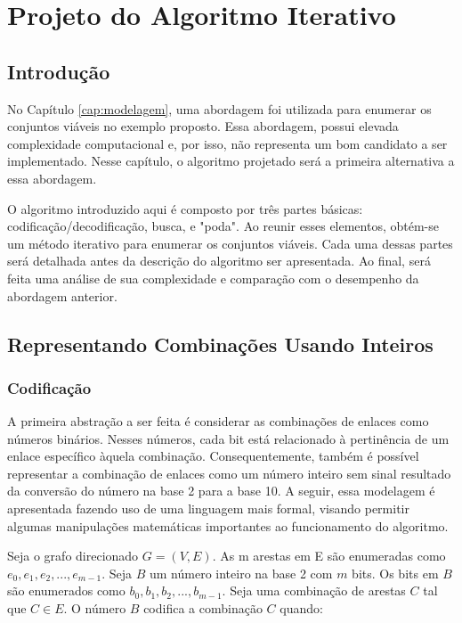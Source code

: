 \chapter{Projeto do Algoritmo Iterativo}
\label{cap:iterativo}

\section{Introdução}

No Capítulo \ref{cap:modelagem}, uma abordagem foi utilizada para enumerar os conjuntos viáveis no exemplo proposto. Essa abordagem, possui elevada complexidade computacional e, por isso, não representa um bom candidato a ser implementado. Nesse capítulo, o algoritmo projetado será a primeira alternativa a essa abordagem.

O algoritmo introduzido aqui é composto por três partes básicas: codificação/decodificação, busca, e "poda". Ao reunir esses elementos, obtém-se um método iterativo para enumerar os conjuntos viáveis. Cada uma dessas partes será detalhada antes da descrição do algoritmo ser apresentada. Ao final, será feita uma análise de sua complexidade e comparação com o desempenho da abordagem anterior. 

\section{Representando Combinações Usando Inteiros}

\subsection{Codificação}

A primeira abstração a ser feita é considerar as combinações de enlaces como números binários. Nesses números, cada bit está relacionado à pertinência de um enlace específico àquela combinação. Consequentemente, também é possível representar a combinação de enlaces como um número inteiro sem sinal resultado da conversão do número na base 2 para a base 10. A seguir, essa modelagem é apresentada fazendo uso de uma linguagem mais formal, visando permitir algumas manipulações matemáticas importantes ao funcionamento do algoritmo.

Seja o grafo direcionado $G=(V,E)$. As m arestas em E são enumeradas como $e_0, e_1, e_2, ..., e_{m-1}$. Seja $B$ um número inteiro na base 2 com $m$ bits. Os bits em $B$ são enumerados como $b_0, b_1, b_2, ..., b_{m-1}$. Seja uma combinação de arestas $C$ tal que $C \in E$. O número $B$ codifica a combinação $C$ quando:

